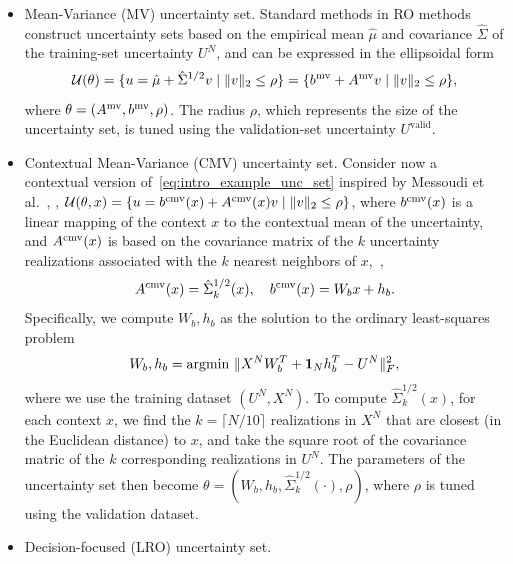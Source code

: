 \begin{itemize}
    \item  Mean-Variance (MV) uncertainty set. 
Standard methods in \gls{RO} methods construct uncertainty sets based on
the empirical mean $\hat{\mu}$ and covariance $\hat{\Sigma}$ of the training-set uncertainty $U^{N}$, and can be expressed in the ellipsoidal form
\begin{equation}\label{eq:intro_example_unc_set}
	{\mathcal{U}}{(\theta)} = \{u = \hat{\mu} + \hat{\Sigma}^{1/2} v \mid \|v\|_2 \leq \rho\} = \{b^{\rm mv} + A^{\rm mv} v \mid \|v\|_2 \leq \rho\},
\end{equation}
where $\theta = (A^{\rm mv}, b^{\rm mv},\rho)$. 
The radius $\rho$, which represents the size of the uncertainty set, is tuned using the validation-set uncertainty $U^{\text{valid}}$.
\item Contextual Mean-Variance (CMV) uncertainty set. Consider now a contextual version of~\eqref{eq:intro_example_unc_set} inspired by Messoudi et al.~\cite{knn}, \ie,
${\mathcal{U}}(\theta,x) =\{u = b^{\rm cmv}(x) + A^{\rm cmv}(x)v \mid \|v\|_2 \leq \rho\}$, where $b^{\rm cmv}(x)$ is a linear mapping of the context $x$ to the contextual mean of the uncertainty, and $A^{\rm cmv}(x)$ is based on the covariance matrix of the $k$ uncertainty realizations associated with the $k$ nearest neighbors of $x$,~\ie,
\begin{equation}
    A^{\rm cmv}(x) = \hat{\Sigma}_k^{1/2}(x),\quad b^{\rm cmv}(x) = W_bx+h_b.
\end{equation} 
 Specifically, we compute $W_b,h_b$ as the solution to the ordinary least-squares problem
$$W_b,h_b=\text{argmin}~\|X^N W_b^T + \mathbf 1_{N}h_b^T - U^N\|_F^2,$$
where we use the training dataset $(U^N, X^N)$. To compute $\hat{\Sigma}_k^{1/2}(x)$, for each context $x$, we find the $k = \lceil N/10\rceil$ realizations in $X^N$ that are closest (in the Euclidean distance) to $x$, and take the square root of the covariance matric of the $k$ corresponding realizations in $U^N$. The parameters of the uncertainty set then become $\theta = (W_b,h_b, \hat{\Sigma}_k^{1/2}(\cdot),\rho)$, where $\rho$ is tuned using the validation dataset. 
\item Decision-focused (LRO) uncertainty set.
\end{itemize}


